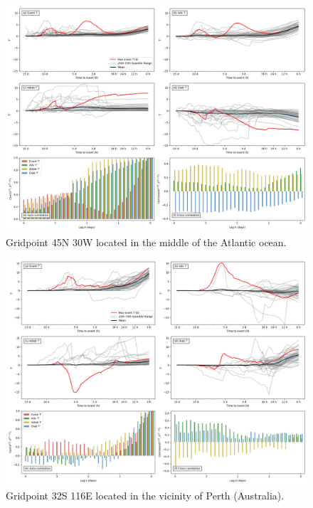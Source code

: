 \begin{figure}[h]
\includegraphics[width=\textwidth]{images/sup2.png}
\caption{Gridpoint 45N 30W located in the middle of the Atlantic ocean.}
\end{figure}

\begin{figure}[h]
\includegraphics[width=\textwidth]{images/sup3.png}
\caption{Gridpoint 32S 116E located in the vicinity of Perth (Australia).}
\end{figure}

